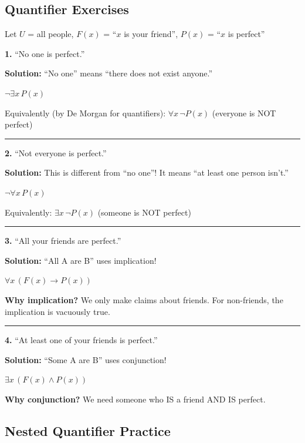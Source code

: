 \documentclass[11pt,a4paper]{article}
\begin{document}
\subsection{Quantifier Exercises}

\begin{examplebox}
Let $U$ = all people, $F(x)$ = ``$x$ is your friend'', $P(x)$ = ``$x$ is perfect''

\textbf{1.} ``No one is perfect.''

\textbf{Solution:} ``No one'' means ``there does not exist anyone.''

$\neg \exists x\, P(x)$

Equivalently (by De Morgan for quantifiers): $\forall x\, \neg P(x)$ (everyone is NOT perfect)

\rule{\linewidth}{0.3pt}

\textbf{2.} ``Not everyone is perfect.''

\textbf{Solution:} This is different from ``no one''! It means ``at least one person isn't.''

$\neg \forall x\, P(x)$

Equivalently: $\exists x\, \neg P(x)$ (someone is NOT perfect)

\rule{\linewidth}{0.3pt}

\textbf{3.} ``All your friends are perfect.''

\textbf{Solution:} ``All A are B'' uses implication!

$\forall x\, (F(x) \to P(x))$

\textbf{Why implication?} We only make claims about friends. For non-friends, the implication is vacuously true.

\rule{\linewidth}{0.3pt}

\textbf{4.} ``At least one of your friends is perfect.''

\textbf{Solution:} ``Some A are B'' uses conjunction!

$\exists x\, (F(x) \land P(x))$

\textbf{Why conjunction?} We need someone who IS a friend AND IS perfect.
\end{examplebox}

\subsection{Nested Quantifier Practice}
\end{document}
